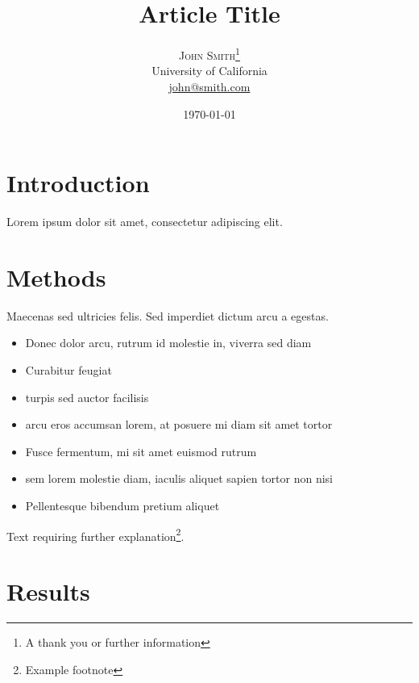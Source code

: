 \documentclass[twoside,twocolumn]{article}
\title{Article Title} %
\author{%
    \textsc{John Smith}\thanks{A thank you or further information} \\[1ex] %
    \normalsize University of California \\ %
    \normalsize \href{mailto:john@smith.com}{john@smith.com} %
    }
\date{\today} %
\begin{document}
    
    \maketitle
    
    
    \section{Introduction}
    
    \lettrine[nindent=0em,lines=3]{L} orem ipsum dolor sit amet, consectetur adipiscing elit.
    \blindtext %
    
    \blindtext %
    
    
    \section{Methods}
    
    Maecenas sed ultricies felis. Sed imperdiet dictum arcu a egestas. 
    \begin{itemize}
    \item Donec dolor arcu, rutrum id molestie in, viverra sed diam
    \item Curabitur feugiat
    \item turpis sed auctor facilisis
    \item arcu eros accumsan lorem, at posuere mi diam sit amet tortor
    \item Fusce fermentum, mi sit amet euismod rutrum
    \item sem lorem molestie diam, iaculis aliquet sapien tortor non nisi
    \item Pellentesque bibendum pretium aliquet
    \end{itemize}
    \blindtext %
    
    Text requiring further explanation\footnote{Example footnote}.
    
    
    \section{Results}
    
\end{document}
